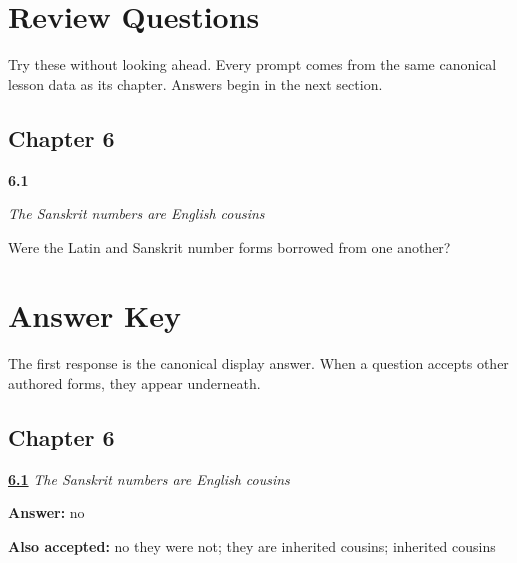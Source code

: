 
\chapter*{Review Questions}

Try these without looking ahead. Every prompt comes from the same canonical lesson data as its chapter. Answers begin in the next section.

\section*{Chapter 6}

\noindent\begin{minipage}[t]{\linewidth}
\raggedright
\hypertarget{review-SA-C06-number-cognates-inheritance}{\textbf{6.1}} \emph{The Sanskrit numbers are English cousins}\par
\small Were the Latin and Sanskrit number forms borrowed from one another?
\end{minipage}\par\medskip

\chapter*{Answer Key}

The first response is the canonical display answer. When a question accepts other authored forms, they appear underneath.

\section*{Chapter 6}

\noindent\begin{minipage}[t]{\linewidth}
\raggedright
\hyperlink{review-SA-C06-number-cognates-inheritance}{\textbf{6.1}} \emph{The Sanskrit numbers are English cousins}\par
\small \textbf{Answer:} no\par
\footnotesize \textbf{Also accepted:} no they were not; they are inherited cousins; inherited cousins
\end{minipage}\par\medskip
